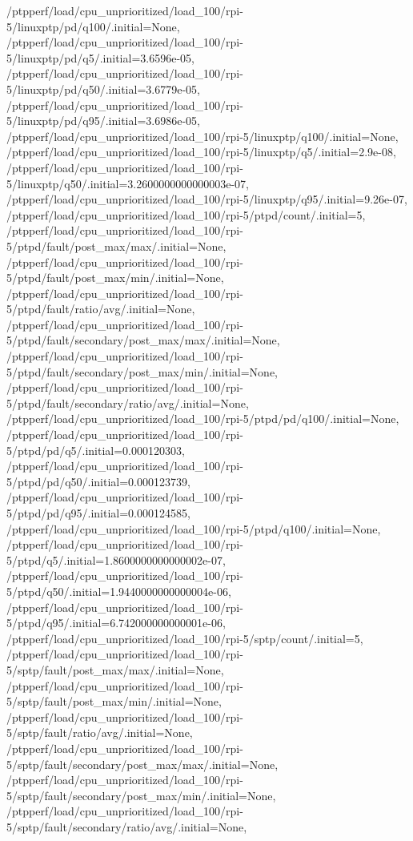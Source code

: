 {    /ptpperf/load/cpu_unprioritized/load_100/rpi-5/linuxptp/pd/q100/.initial=None,
    /ptpperf/load/cpu_unprioritized/load_100/rpi-5/linuxptp/pd/q5/.initial=3.6596e-05,
    /ptpperf/load/cpu_unprioritized/load_100/rpi-5/linuxptp/pd/q50/.initial=3.6779e-05,
    /ptpperf/load/cpu_unprioritized/load_100/rpi-5/linuxptp/pd/q95/.initial=3.6986e-05,
    /ptpperf/load/cpu_unprioritized/load_100/rpi-5/linuxptp/q100/.initial=None,
    /ptpperf/load/cpu_unprioritized/load_100/rpi-5/linuxptp/q5/.initial=2.9e-08,
    /ptpperf/load/cpu_unprioritized/load_100/rpi-5/linuxptp/q50/.initial=3.2600000000000003e-07,
    /ptpperf/load/cpu_unprioritized/load_100/rpi-5/linuxptp/q95/.initial=9.26e-07,
    /ptpperf/load/cpu_unprioritized/load_100/rpi-5/ptpd/count/.initial=5,
    /ptpperf/load/cpu_unprioritized/load_100/rpi-5/ptpd/fault/post_max/max/.initial=None,
    /ptpperf/load/cpu_unprioritized/load_100/rpi-5/ptpd/fault/post_max/min/.initial=None,
    /ptpperf/load/cpu_unprioritized/load_100/rpi-5/ptpd/fault/ratio/avg/.initial=None,
    /ptpperf/load/cpu_unprioritized/load_100/rpi-5/ptpd/fault/secondary/post_max/max/.initial=None,
    /ptpperf/load/cpu_unprioritized/load_100/rpi-5/ptpd/fault/secondary/post_max/min/.initial=None,
    /ptpperf/load/cpu_unprioritized/load_100/rpi-5/ptpd/fault/secondary/ratio/avg/.initial=None,
    /ptpperf/load/cpu_unprioritized/load_100/rpi-5/ptpd/pd/q100/.initial=None,
    /ptpperf/load/cpu_unprioritized/load_100/rpi-5/ptpd/pd/q5/.initial=0.000120303,
    /ptpperf/load/cpu_unprioritized/load_100/rpi-5/ptpd/pd/q50/.initial=0.000123739,
    /ptpperf/load/cpu_unprioritized/load_100/rpi-5/ptpd/pd/q95/.initial=0.000124585,
    /ptpperf/load/cpu_unprioritized/load_100/rpi-5/ptpd/q100/.initial=None,
    /ptpperf/load/cpu_unprioritized/load_100/rpi-5/ptpd/q5/.initial=1.8600000000000002e-07,
    /ptpperf/load/cpu_unprioritized/load_100/rpi-5/ptpd/q50/.initial=1.9440000000000004e-06,
    /ptpperf/load/cpu_unprioritized/load_100/rpi-5/ptpd/q95/.initial=6.742000000000001e-06,
    /ptpperf/load/cpu_unprioritized/load_100/rpi-5/sptp/count/.initial=5,
    /ptpperf/load/cpu_unprioritized/load_100/rpi-5/sptp/fault/post_max/max/.initial=None,
    /ptpperf/load/cpu_unprioritized/load_100/rpi-5/sptp/fault/post_max/min/.initial=None,
    /ptpperf/load/cpu_unprioritized/load_100/rpi-5/sptp/fault/ratio/avg/.initial=None,
    /ptpperf/load/cpu_unprioritized/load_100/rpi-5/sptp/fault/secondary/post_max/max/.initial=None,
    /ptpperf/load/cpu_unprioritized/load_100/rpi-5/sptp/fault/secondary/post_max/min/.initial=None,
    /ptpperf/load/cpu_unprioritized/load_100/rpi-5/sptp/fault/secondary/ratio/avg/.initial=None,
}
